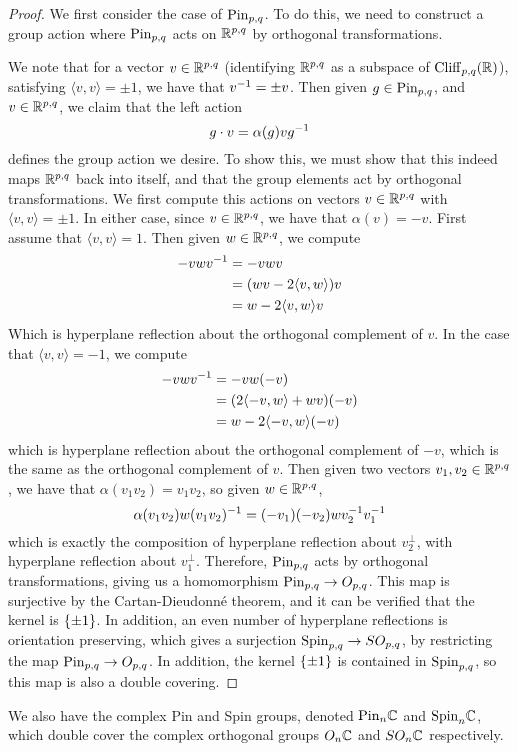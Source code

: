%
\begin{proof}
We first consider the case of $\mathrm{Pin}_{p,q}$. To do this, we need to construct
a group action where $\mathrm{Pin}_{p,q}$ acts on $\mathbb{R}^{p,q}$ by orthogonal transformations.
\iffalse
There exists an involution $T : \Cliff_{p,q}(\R) \to \Cliff_{p,q}(\R)$, where given
the standard orthogonal basis $\set{e_1, \ldots, e_{p+1}}$, we define
\[
T(e_{i_1}\cdots e_{i_k}) = e_{i_k}\cdots e_{i_1}
\]
and extending linearly to the remainder of $\Cliff_{p,q}(\R)$. Given $a \in
\Cliff_{p,q}(\R)$, we denote $T(a)$ by $a^T$.
\fi
We note that for a vector
$v \in \mathbb{R}^{p,q}$ (identifying $\mathbb{R}^{p,q}$ as a subspace of $\Cliff_{p,q}(\R)$),
satisfying $\langle v,v \rangle = \pm 1$, we have that
$v^{-1} = \pm v$. Then given $g \in \mathrm{Pin}_{p,q}$, and $v \in \mathbb{R}^{p,q}$, we claim
that the left action
\[
g \cdot v = \alpha(g)vg^{-1}
\]
defines the group action we desire. To show this, we must show that this indeed
maps $\mathbb{R}^{p,q}$ back into itself, and that the group elements act by orthogonal
transformations. We first compute this actions on vectors $v \in \mathbb{R}^{p,q}$ with
$\langle v,v \rangle = \pm 1$. In either case, since $v \in \mathbb{R}^{p,q}$, we have
that $\alpha(v) = -v$. First assume that $\langle v,v \rangle = 1$. Then given
$w \in \mathbb{R}^{p,q}$, we compute
%
\begin{align*}
-vwv^{-1} &= -vwv \\
&= (wv - 2\langle v,w \rangle)v \\
&= w - 2\langle v,w \rangle v
\end{align*}
%
Which is hyperplane reflection about the orthogonal complement of $v$. In the
case that $\langle v,v \rangle = -1$, we compute
%
\begin{align*}
-vwv^{-1} &= -vw(-v) \\
&= (2\langle -v,w\rangle + wv)(-v) \\
&= w - 2\langle -v,w \rangle(-v)
\end{align*}
which is hyperplane reflection about the orthogonal complement of $-v$,
which is the same as the orthogonal complement of $v$. Then given two
vectors $v_1,v_2 \in \mathbb{R}^{p,q}$, we have that $\alpha(v_1v_2) = v_1v_2$,
so given $w \in \mathbb{R}^{p,q}$,
\[
\alpha(v_1v_2)w(v_1v_2)^{-1} = (-v_1)(-v_2)wv_2^{-1} v_1^{-1}
\]
which is exactly the composition of hyperplane reflection about $v_2^\perp$,
with hyperplane reflection about $v_1^\perp$. Therefore,
$\mathrm{Pin}_{p,q}$ acts by orthogonal transformations, giving us a homomorphism
$\mathrm{Pin}_{p,q} \to O_{p,q}$. This map is surjective by the Cartan-Dieudonn\'e
theorem, and it can be verified that the kernel is $\left\lbrace \pm 1 \right\rbrace$. In addition,
an even number of hyperplane reflections is orientation preserving, which gives
a surjection $\mathrm{Spin}_{p,q} \to SO_{p,q}$, by restricting the map
$\mathrm{Pin}_{p,q} \to O_{p,q}$. In addition, the kernel $\left\lbrace \pm 1 \right\rbrace$ is contained in $\mathrm{Spin}_{p,q}$, so this map is also a double covering.
%
\end{proof}
%
We also have the complex Pin and Spin groups, denoted $\mathrm{Pin}_n\mathbb{C}$ and $\mathrm{Spin}_n\mathbb{C}$,
which double cover the complex orthogonal groups $O_n\mathbb{C}$ and $SO_n\mathbb{C}$
respectively.\\

